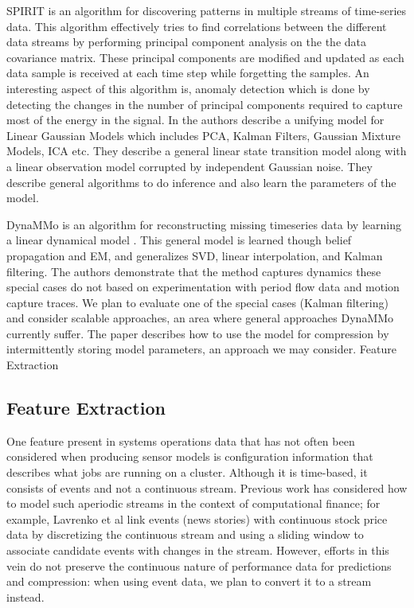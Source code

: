 SPIRIT \cite{papadimitriou2005streaming} is an algorithm for discovering patterns in multiple streams of time-series data. This algorithm effectively tries to find correlations between the different data streams by performing principal component analysis on the the data covariance matrix. These principal components are modified and updated as each data sample is received at each time step while forgetting the samples. An interesting aspect of this algorithm is, anomaly detection which is done by detecting the changes in the number of principal components required to capture most of the energy in the signal.
In \cite{roweis1999unifying} the authors describe a unifying model for Linear Gaussian Models which includes PCA, Kalman Filters, Gaussian Mixture Models, ICA etc. They describe a general linear state transition model along with a linear observation model corrupted by independent Gaussian noise. They describe general algorithms to do inference and also learn the parameters of the model.

DynaMMo is an algorithm for reconstructing missing timeseries data by learning a linear dynamical model \cite{Li2009}. This general model is learned though belief propagation and EM, and generalizes SVD, linear interpolation, and Kalman filtering. The authors demonstrate that the method captures dynamics these special cases do not based on experimentation with period flow data and motion capture traces. We plan to evaluate one of the special cases (Kalman filtering) and consider scalable approaches, an area where general approaches DynaMMo currently suffer. The paper describes how to use the model for compression by intermittently storing model parameters, an approach we may consider.
Feature Extraction

\subsection{Feature Extraction}
One feature present in systems operations data that has not often been considered when producing sensor models is configuration information that describes what jobs are running on a cluster. Although it is time-based, it consists of events and not a continuous stream. Previous work has considered how to model such aperiodic streams in the context of computational finance; for example, Lavrenko et al \cite{Lavrenko2000} link events (news stories) with continuous stock price data by discretizing the continuous stream and using a sliding window to associate candidate events with changes in the stream. However, efforts in this vein do not preserve the continuous nature of performance data for predictions and compression: when using event data, we plan to convert it to a stream instead.

